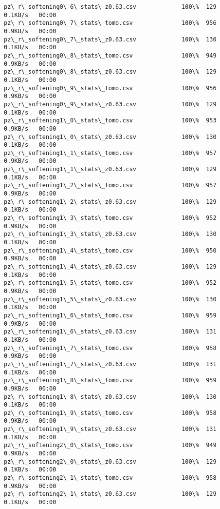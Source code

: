 \documentclass[11pt]{article}
\begin{document}
\begin{Verbatim}[commandchars=\\\{\}]
pz\_r\_softening0\_6\_stats\_z0.63.csv             100\%  129     0.1KB/s   00:00    
pz\_r\_softening0\_7\_stats\_tomo.csv              100\%  956     0.9KB/s   00:00    
pz\_r\_softening0\_7\_stats\_z0.63.csv             100\%  130     0.1KB/s   00:00    
pz\_r\_softening0\_8\_stats\_tomo.csv              100\%  949     0.9KB/s   00:00    
pz\_r\_softening0\_8\_stats\_z0.63.csv             100\%  129     0.1KB/s   00:00    
pz\_r\_softening0\_9\_stats\_tomo.csv              100\%  956     0.9KB/s   00:00    
pz\_r\_softening0\_9\_stats\_z0.63.csv             100\%  129     0.1KB/s   00:00    
pz\_r\_softening1\_0\_stats\_tomo.csv              100\%  953     0.9KB/s   00:00    
pz\_r\_softening1\_0\_stats\_z0.63.csv             100\%  130     0.1KB/s   00:00    
pz\_r\_softening1\_1\_stats\_tomo.csv              100\%  957     0.9KB/s   00:00    
pz\_r\_softening1\_1\_stats\_z0.63.csv             100\%  129     0.1KB/s   00:00    
pz\_r\_softening1\_2\_stats\_tomo.csv              100\%  957     0.9KB/s   00:00    
pz\_r\_softening1\_2\_stats\_z0.63.csv             100\%  129     0.1KB/s   00:00    
pz\_r\_softening1\_3\_stats\_tomo.csv              100\%  952     0.9KB/s   00:00    
pz\_r\_softening1\_3\_stats\_z0.63.csv             100\%  130     0.1KB/s   00:00    
pz\_r\_softening1\_4\_stats\_tomo.csv              100\%  950     0.9KB/s   00:00    
pz\_r\_softening1\_4\_stats\_z0.63.csv             100\%  129     0.1KB/s   00:00    
pz\_r\_softening1\_5\_stats\_tomo.csv              100\%  952     0.9KB/s   00:00    
pz\_r\_softening1\_5\_stats\_z0.63.csv             100\%  130     0.1KB/s   00:00    
pz\_r\_softening1\_6\_stats\_tomo.csv              100\%  959     0.9KB/s   00:00    
pz\_r\_softening1\_6\_stats\_z0.63.csv             100\%  131     0.1KB/s   00:00    
pz\_r\_softening1\_7\_stats\_tomo.csv              100\%  958     0.9KB/s   00:00    
pz\_r\_softening1\_7\_stats\_z0.63.csv             100\%  131     0.1KB/s   00:00    
pz\_r\_softening1\_8\_stats\_tomo.csv              100\%  959     0.9KB/s   00:00    
pz\_r\_softening1\_8\_stats\_z0.63.csv             100\%  130     0.1KB/s   00:00    
pz\_r\_softening1\_9\_stats\_tomo.csv              100\%  958     0.9KB/s   00:00    
pz\_r\_softening1\_9\_stats\_z0.63.csv             100\%  131     0.1KB/s   00:00    
pz\_r\_softening2\_0\_stats\_tomo.csv              100\%  949     0.9KB/s   00:00    
pz\_r\_softening2\_0\_stats\_z0.63.csv             100\%  129     0.1KB/s   00:00    
pz\_r\_softening2\_1\_stats\_tomo.csv              100\%  958     0.9KB/s   00:00    
pz\_r\_softening2\_1\_stats\_z0.63.csv             100\%  129     0.1KB/s   00:00    

\end{Verbatim}
\end{document}
